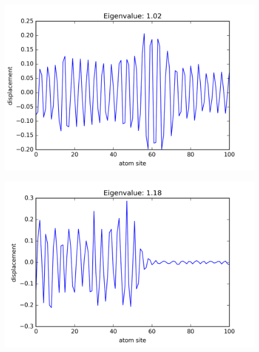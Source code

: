 \begin{figure}[!htbh]
\centering
\begin{minipage}{.45\textwidth}
  \centering
  \includegraphics[width=1.1\linewidth]{Harmonic_mass_ratio/normal_Prob_0_1N_103m_2p_51th.png}
  \label{fig:mass prob 0.1 51th}
\end{minipage}\qquad
\begin{minipage}{.45\textwidth}
  \centering
  \includegraphics[width=1.1\linewidth]{Harmonic_mass_ratio/normal_Prob_0_5N_103m_2p_51th.png}
  \label{fig:mass prob 0.5 51th}
\end{minipage}
\end{figure}


